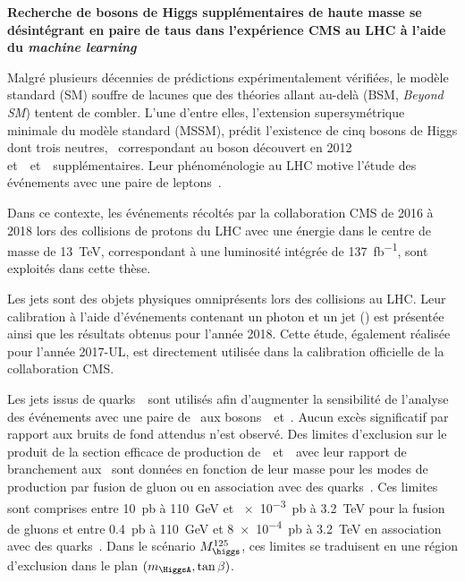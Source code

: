 \begin{center}
\LARGE
\bf
\sffamily
Recherche de bosons de Higgs supplémentaires de haute masse se désintégrant en paire de taus dans l'expérience CMS au LHC à l'aide du \emph{machine learning}
\end{center}

\vspace{2\baselineskip}

Malgré plusieurs décennies de prédictions expérimentalement vérifiées,
le modèle standard (SM) souffre de lacunes
que des théories allant au-delà (BSM, \emph{Beyond SM})
tentent de combler.
L'une d'entre elles,
l'extension supersymétrique minimale du modèle standard (MSSM),
prédit l'existence de cinq bosons de Higgs dont trois neutres,
\higgs\ correspondant au boson découvert en 2012
et~\Higgs\ et~\HiggsA\ supplémentaires.
Leur phénoménologie au LHC
motive l'étude des événements avec une paire de leptons~\tau.
\par
Dans ce contexte,
les événements récoltés par la collaboration CMS
de 2016 à 2018
lors des collisions de protons du LHC
avec une énergie dans le centre de masse de \SI{13}{\TeV},
correspondant à une luminosité intégrée de \SI{137}{\femto\barn^{-1}},
sont exploités dans cette thèse.
\par
Les jets sont des objets physiques omniprésents lors des collisions au LHC.
Leur calibration à l'aide d'événements contenant un photon et un jet (\Gjet) est présentée ainsi que les résultats obtenus pour l'année 2018.
Cette étude,
également réalisée pour l'année 2017-UL,
est directement utilisée dans la calibration officielle de la collaboration CMS.
\par
Les jets issus de quarks~\quarkb\ sont utilisés afin d'augmenter la sensibilité de l'analyse
des événements avec une paire de \tau\ aux bosons~\Higgs\ et~\HiggsA.
Aucun excès significatif par rapport aux bruits de fond attendus n'est observé.
Des limites d'exclusion sur le produit de la section efficace de production de~\Higgs\ et~\HiggsA\ avec leur rapport de branchement aux \tau\ sont données
en fonction de leur masse
pour les modes de production par fusion de gluon ou en association avec des quarks~\quarkb.
Ces limites sont comprises entre
\SI{10}{\pico\barn} à \SI{110}{\GeV}
et
\SI{e-3}{\pico\barn} à \SI{3.2}{\TeV}
pour la fusion de gluons
et entre
\SI{0.4}{\pico\barn} à \SI{110}{\GeV}
et
\SI{8e-4}{\pico\barn} à \SI{3.2}{\TeV}
en association avec des quarks~\quarkb.
Dans le scénario $M_{\higgs}^{125}$,
ces limites se traduisent en une région d'exclusion dans le plan $(m_{\HiggsA},\tan\beta)$.

